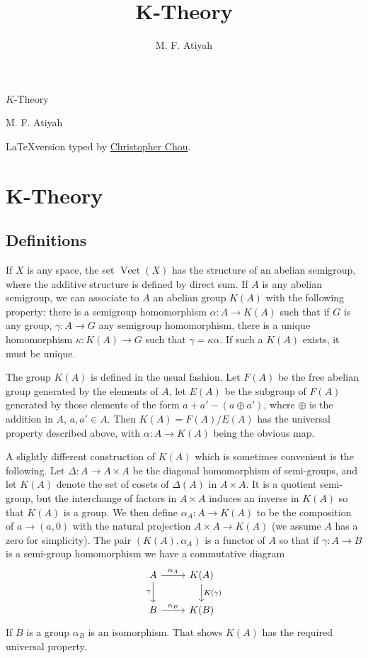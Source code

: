 \documentclass[leqno]{book}
\title{K-Theory}
\author{M. F. Atiyah}
\numberwithin{equation}{section}
\theoremstyle{definition}
\begin{document}
    \begin{titlepage}
      \vspace*{1cm}
      {\huge\raggedright $K$-Theory\par}
      \noindent\hrulefill\par
      {\LARGE\raggedleft M. F. Atiyah\par}
      \vfill
      {\Large\raggedleft \LaTeX version typed by \href{redenduster@163.com}{Christopher Chou}.\par}
    \end{titlepage}
    \tableofcontents
    \setcounter{chapter}{1}
    \chapter{K-Theory}
        \section{Definitions}
            If $X$ is any space, the set $\operatorname{Vect}(X)$ has the structure of an abelian semigroup, where the additive structure is defined by direct sum. If $A$ is any abelian semigroup, we can associate to $A$ an abelian group $K(A)$ with the following property: there is a semigroup homomorphism $\alpha:A\to K(A)$ such that if $G$ is any group, $\gamma:A\to G$ any semigroup homomorphism, there is a unique homomorphism $\kappa:K(A)\to G$ such that $\gamma=\kappa \alpha$. If such a $K(A)$ exists, it must be unique.

            The group $K(A)$ is defined in the usual fashion. Let $F(A)$ be the free abelian group generated by the elements of $A$, let $E(A)$ be the subgroup of $F(A)$ generated by those elements of the form $a+a'-(a \oplus a')$, where $\oplus $ is the addition in $A$, $a,a'\in A$. Then $K(A)=F(A)/E(A)$ has the universal property described above, with $\alpha:A\to K(A)$ being the obvious map.

            A slightly different construction of $K(A)$ which is sometimes convenient is the following. Let $\Delta:A\to A\times A$ be the diagonal homomorphism of semi-groups, and let $K(A)$ denote the set of cosets of $\Delta(A)$ in $A\times A$. It is a quotient semi-group, but the interchange of factors in $A\times A$ induces an inverse in $K(A)$ so that $K(A)$ is a group. We then define $\alpha _{A}:A\to K(A)$ to be the composition of $a\to (a,0)$ with the natural projection $A\times A\to K(A)$ (we assume $A$ has a zero for simplicity). The pair $(K(A),\alpha _{A})$ is a functor of $A$ so that if $\gamma:A\to B$ is a semi-group homomorphism we have a commutative diagram
            \begin{equation*}
                \begin{tikzcd}
                    A \arrow[d, "\gamma"'] \arrow[r, "\alpha_A"] & K(A) \arrow[d, "K(\gamma)"] \\
                    B \arrow[r, "\alpha_B"]                      & K(B)                       
                \end{tikzcd}
            \end{equation*}
            If $B$ is a group $\alpha _{B}$ is an isomorphism. That shows $K(A)$ has the required universal property.
\end{document}
